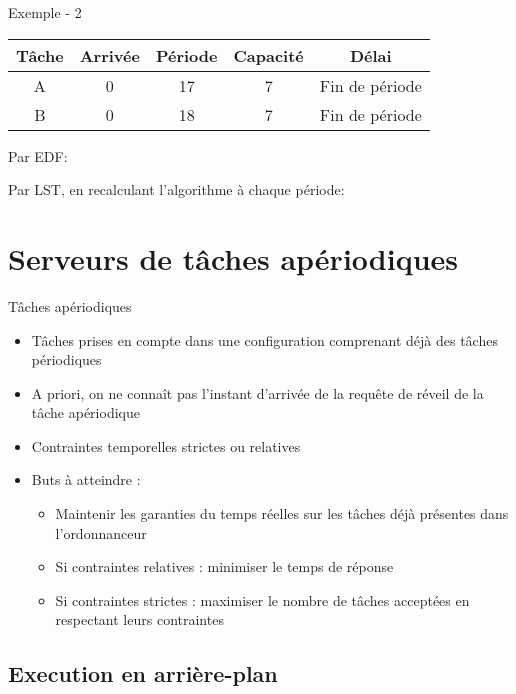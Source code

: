 \begin{frame}{Exemple - 2}
  \begin{center}
    \begin{tabular}{ccccc}
      \hline
      Tâche & Arrivée & Période & Capacité & Délai \\
      \hline
      A & 0 & 17 & 7 & Fin de période\\
      B & 0 & 18 & 7 & Fin de période\\
      \hline
    \end{tabular}
  \end{center}
  Par EDF:
  \pause
  \begin{center}  
    
  \end{center}
  Par LST, en recalculant l'algorithme à chaque période:
  \pause
  \begin{center}  
    
  \end{center}
\end{frame} 

\section{Serveurs de tâches apériodiques}


\begin{frame}{Tâches apériodiques} 
  \begin{itemize}
  \item Tâches prises en compte dans une configuration comprenant déjà
    des tâches périodiques
  \item A priori, on ne  connaît pas l'instant d'arrivée de la requête
    de réveil de la tâche apériodique
  \item Contraintes temporelles strictes ou relatives 
  \item Buts à atteindre : 
    \begin{itemize}
    \item Maintenir les garanties du temps réelles sur les tâches déjà
      présentes dans l'ordonnanceur
    \item Si contraintes relatives : minimiser le temps de réponse
    \item  Si contraintes  strictes :  maximiser le  nombre  de tâches
      acceptées en respectant leurs contraintes
    \end{itemize}
  \end{itemize}
\end{frame}

\subsection{Execution en arrière-plan}

